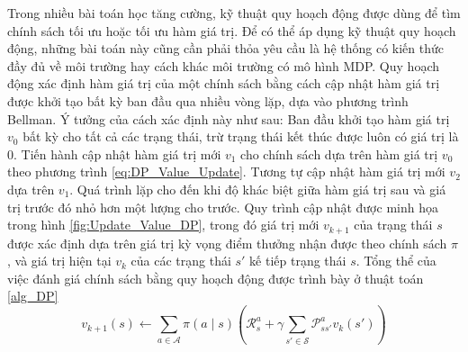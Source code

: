 Trong nhiều bài toán học tăng cường, kỹ thuật quy hoạch động được dùng để tìm chính sách tối ưu hoặc tối ưu hàm giá trị. Để có thể áp dụng kỹ thuật quy hoạch động, những bài toán này cũng cần phải thỏa yêu cầu là hệ thống có kiến thức đầy đủ về môi trường hay cách khác môi trường có mô hình MDP.
Quy hoạch động xác định hàm giá trị của một chính sách bằng cách cập nhật hàm giá trị được khởi tạo bất kỳ ban đầu qua nhiều vòng lặp, dựa vào phương trình Bellman. Ý tưởng của cách xác định này như sau: Ban đầu khởi tạo hàm giá trị $v_0$ bất kỳ cho tất cả các trạng thái, trừ trạng thái kết thúc được luôn có giá trị là 0. Tiến hành cập nhật hàm giá trị mới $v_1$ cho chính sách dựa trên hàm giá trị $v_0$ theo phương trình \ref{eq:DP_Value_Update}. Tương tự cập nhật hàm giá trị mới $v_2$ dựa trên $v_1$. Quá trình lặp cho đến khi độ khác biệt giữa hàm giá trị sau và giá trị trước đó nhỏ hơn một lượng cho trước. Quy trình cập nhật được minh họa trong hình \ref{fig:Update_Value_DP}, trong đó giá trị mới $v_{k+1}$ của trạng thái $s$ được xác định dựa trên giá trị kỳ vọng điểm thưởng nhận được theo chính sách $\pi$, và giá trị hiện tại $v_{k}$ của các trạng thái $s'$ kế tiếp trạng thái $s$. Tổng thể của việc đánh giá chính sách bằng quy hoạch động được trình bày ở thuật toán \ref{alg_DP}
\begin{equation}
v_{k+1}(s) \leftarrow \sum_{a \in \mathcal{A}}^{}\pi(a \mid s)(\mathcal{R}_{s}^{a} + \gamma \sum_{s' \in \mathcal{S}}^{}\mathcal{P}_{ss'}^{a}v_{k}(s'))
\label{eq:DP_Value_Update}
\end{equation}		
